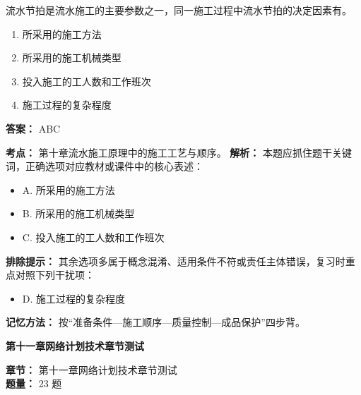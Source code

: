 \documentclass[UTF8,fontset=fandol,11pt]{ctexart}
\newcommand{\chaptertitle}[1]{\vspace{0.5em}\begin{tcolorbox}[enhanced,colback=deepblue,colframe=deepblue,arc=2mm,boxrule=0pt]\begin{center}\Large\bfseries\color{white}#1\end{center}\end{tcolorbox}\vspace{0.5em}}
\begin{document}
\begin{quizbox}[title={第 23 题}]
流水节拍是流水施工的主要参数之一，同一施工过程中流水节拍的决定因素有。\\
\begin{enumerate}[label=\Alph*.]
\item 所采用的施工方法
\item 所采用的施工机械类型
\item 投入施工的工人数和工作班次
\item 施工过程的复杂程度
\end{enumerate}
\textbf{答案：} ABC
\vspace{0.25em}
\begin{answerbox}[title={考点解析}]
\textbf{考点：} 第十章流水施工原理中的施工工艺与顺序。
\textbf{解析：} 本题应抓住题干关键词，正确选项对应教材或课件中的核心表述：
\begin{itemize}
\item A. 所采用的施工方法
\item B. 所采用的施工机械类型
\item C. 投入施工的工人数和工作班次
\end{itemize}
\textbf{排除提示：} 其余选项多属于概念混淆、适用条件不符或责任主体错误，复习时重点对照下列干扰项：
\begin{itemize}
\item D. 施工过程的复杂程度
\end{itemize}
\textbf{记忆方法：} 按“准备条件—施工顺序—质量控制—成品保护”四步背。
\end{answerbox}
\end{quizbox}

\chaptertitle{第十一章网络计划技术章节测试}
\begin{mainbox}
\textbf{\textcolor{mainblue}{章节：}} 第十一章网络计划技术章节测试\\
\textbf{\textcolor{answerred}{题量：}} 23 题
\end{mainbox}
\end{document}
